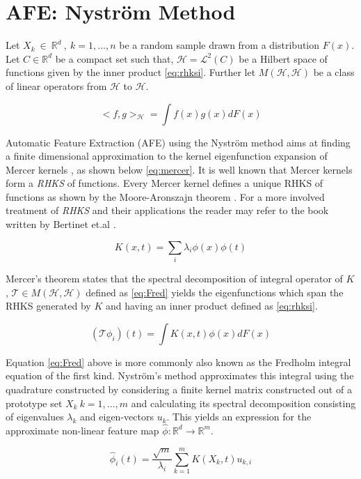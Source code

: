 \section{AFE: Nystr\"om Method} \label{app:nystrom}

Let $X_k \ \in \ \mathbb{R}^d \ , \ k = 1, \hdots ,n$ be a random sample drawn from a distribution $F(x)$. Let $C \in \mathbb{R}^d$ be a compact set such that, $\mathcal{H} = \mathcal{L}^2(C)$ be a Hilbert space of functions given by the inner product \ref{eq:rhksi}. Further let $M(\mathcal{H}, \mathcal{H})$ be a class of linear operators from $\mathcal{H}$ to $\mathcal{H}$.  

\begin{equation} \label{eq:rhksi}
<f,g>_{\mathcal{H}} = \int f(x)g(x) dF(x) 
\end{equation}

Automatic Feature Extraction (AFE) using the Nystr\"om method \cite{nystrom} aims at finding a finite dimensional approximation to the kernel eigenfunction expansion of Mercer kernels \cite{Mercer}, as shown below \ref{eq:mercer}. It is well known that Mercer kernels form a \emph{RHKS} of functions. Every Mercer kernel defines a unique RHKS of functions as shown by the Moore-Aronszajn theorem \cite{N.Aronszjan1950}. For a more involved treatment of \emph{RHKS} and their applications the reader may refer to the book written by Bertinet et.al \cite{RHKSbook}.

\begin{equation}\label{eq:mercer}
K(x,t) = \sum_i{\lambda_i \phi(x)\phi(t)} 
\end{equation}

Mercer's theorem \cite{Mercer} states that the spectral decomposition of integral operator of $K$, $\mathcal{T} \in M(\mathcal{H},\mathcal{H})$ defined as \ref{eq:Fred} yields the eigenfunctions which span the RHKS generated by $K$ and having an inner product defined as \ref{eq:rhksi}. 

\begin{equation} \label{eq:Fred}
(\mathcal{T}\phi_i)(t) = \int K(x,t) \phi(x) dF(x)
\end{equation}

Equation \ref{eq:Fred} above is more commonly also known as the Fredholm integral equation of the first kind. Nystr\"om's method approximates this integral using the quadrature constructed by considering a finite kernel matrix constructed out of a prototype set $X_k \ k = 1, \hdots, m$ and calculating its spectral decomposition consisting of eigenvalues $\lambda_k$ and eigen-vectors $u_k$. This yields an expression for the approximate non-linear feature map $\hat{\phi} : \mathbb{R}^d \longrightarrow \mathbb{R}^m$.

\begin{equation}
\hat{\phi}_{i}(t) = \frac{\sqrt{m}}{\lambda_i}\sum_{k=1}^{m}K(X_k, t)u_{k,i}
\end{equation}
